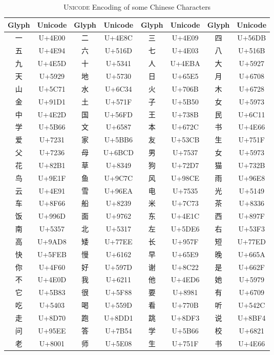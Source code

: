 \begin{CJK}{UTF8}{gbsn} %

\begin{table}[!th]
    \centering
    \begin{tabular}{|c|c|c|c|c|c|c|c|}
    \hline
    \textbf{Glyph} & \textbf{Unicode} & \textbf{Glyph} & \textbf{Unicode} & \textbf{Glyph} & \textbf{Unicode}  & \textbf{Glyph} & \textbf{Unicode} \\
      \hline
    一 & U+4E00 & 二 & U+4E8C & 三 & U+4E09 & 四 & U+56DB \\
    五 & U+4E94 & 六 & U+516D & 七 & U+4E03 & 八 & U+516B \\
    九 & U+4E5D & 十 & U+5341 & 人 & U+4EBA & 大 & U+5927 \\
    天 & U+5929 & 地 & U+5730 & 日 & U+65E5 & 月 & U+6708 \\
    山 & U+5C71 & 水 & U+6C34 & 火 & U+706B & 木 & U+6728 \\
    金 & U+91D1 & 土 & U+571F & 子 & U+5B50 & 女 & U+5973 \\
    中 & U+4E2D & 国 & U+56FD & 王 & U+738B & 民 & U+6C11 \\
    学 & U+5B66 & 文 & U+6587 & 本 & U+672C & 书 & U+4E66 \\
    爱 & U+7231 & 家 & U+5BB6 & 友 & U+53CB & 生 & U+751F \\
    父 & U+7236 & 母 & U+6BCD & 男 & U+7537 & 女 & U+5973 \\
    花 & U+82B1 & 草 & U+8349 & 狗 & U+72D7 & 猫 & U+732B \\
    鸟 & U+9E1F & 鱼 & U+9C7C & 风 & U+98CE & 雨 & U+96E8 \\
    云 & U+4E91 & 雪 & U+96EA & 电 & U+7535 & 光 & U+5149 \\
    车 & U+8F66 & 船 & U+8239 & 米 & U+7C73 & 茶 & U+8336 \\
    饭 & U+996D & 面 & U+9762 & 东 & U+4E1C & 西 & U+897F \\
    南 & U+5357 & 北 & U+5317 & 左 & U+5DE6 & 右 & U+53F3 \\
    高 & U+9AD8 & 矮 & U+77EE & 长 & U+957F & 短 & U+77ED \\
    快 & U+5FEB & 慢 & U+6162 & 早 & U+65E9 & 晚 & U+665A \\
    你 & U+4F60 & 好 & U+597D & 谢 & U+8C22 & 是 & U+662F \\
    不 & U+4E0D & 我 & U+6211 & 他 & U+4ED6 & 她 & U+5979 \\
    它 & U+5B83 & 很 & U+5F88 & 要 & U+8981 & 有 & U+6709 \\
    吃 & U+5403 & 喝 & U+559D & 看 & U+770B & 听 & U+542C \\
    走 & U+8D70 & 跑 & U+8DD1 & 跳 & U+8DF3 & 说 & U+8BF4 \\
    问 & U+95EE & 答 & U+7B54 & 学 & U+5B66 & 校 & U+6821 \\
    老 & U+8001 & 师 & U+5E08 & 生 & U+751F & 书 & U+4E66 \\
    \hline
    \end{tabular}
    \caption{\textsc{Unicode} Encoding of some Chinese Characters}
    \label{tab:chinese_table}
\end{table}
\end{CJK}

